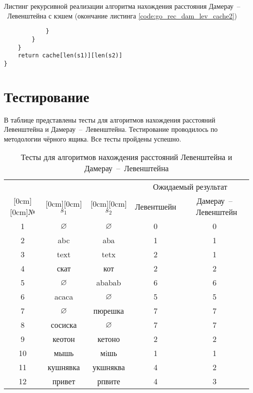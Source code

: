 \begin{code}
\caption{Листинг рекурсивной реализации алгоритма нахождения расстояния Дамерау~--~Левенштейна с кэшем (окончание листинга \ref{code:go_rec_dam_lev_cache2})}
\label{code:go_rec_dam_lev_cache3}

\begin{verbatim}
			}
		}
	}
	return cache[len(s1)][len(s2)]
}
\end{verbatim}
\end{code}

\section{Тестирование}
В таблице  представлены тесты для алгоритмов нахождения расстояний Левенштейна и Дамерау~--~Левенштейна. Тестирование проводилось по методологии чёрного ящика. Все тесты пройдены успешно.

\begin{table}[H]
  \caption{\label{table:tests} Тесты для алгоритмов нахождения расстояний Левенштейна и Дамерау~--~Левенштейна}
  \begin{center}
    \begin{tabular}{|c|c|c|c|c|}
      \hline
       &  &  & \multicolumn{2}{c|}{Ожидаемый результат} \\
      \cline{4-5}
      \raisebox{1.5ex}[0cm][0cm]{№} & \raisebox{1.5ex}[0cm][0cm]{$s_1$} & \raisebox{1.5ex}[0cm][0cm]{$s_2$} 
      &  Левентшейн & Дамерау~--~Левенштейн \\ \hline
      1 & $\varnothing$ & $\varnothing$ & 0 & 0 \\ \hline
      2 & abc & aba & 1 & 1 \\ \hline
      3 & text & tetx & 2 & 1 \\ \hline
      4 & скат & кот & 2 & 2 \\ \hline
      5 & $\varnothing$ & ababab & 6 & 6 \\ \hline
      6 & acaca & $\varnothing$ & 5 & 5 \\ \hline
      7 & $\varnothing$ & пюрешка & 7 & 7 \\ \hline
      8 & сосиска & $\varnothing$ & 7 & 7 \\ \hline
      9 & кеотон & кетоно & 2 & 2 \\ \hline
      10 & мышь & мiшь & 1 & 1 \\ \hline
      11 & кушнявка & укшняква & 4 & 2 \\ \hline
      12 & привет & рпвите & 4 & 3 \\ \hline
    \end{tabular}
  \end{center}
\end{table}

\newpage